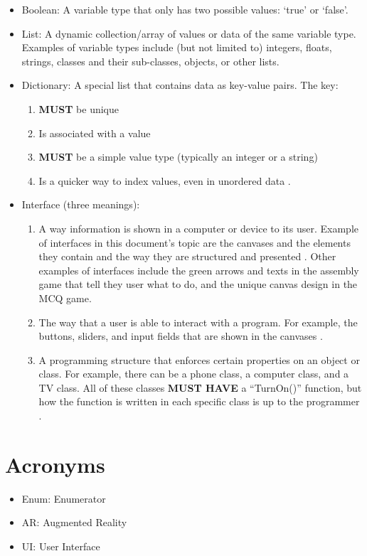 \documentclass[a4paper, 12pt]{article}
\begin{document}
\begin{itemize}
    \item{Boolean: A variable type that only has two possible values: ‘true\normalfont’ or ‘false\normalfont’.}
    \item{List: A dynamic collection/array of values or data of the same variable type. Examples of variable types include (but not limited to) integers, floats, strings, classes and their sub-classes, objects, or other lists.}
    
        \item{Dictionary: A special list that contains data as key-value pairs. The key:
        
        \begin{enumerate}
        
        \item{\textbf{MUST} be unique}
        \item{Is associated with a value}
        \item{\textbf{MUST} be a simple value type (typically an integer or a string)}
        \item{Is a quicker way to index values, even in unordered data \cite{DictionaryMeaning}.}        
        \end{enumerate}        
        }    
    \item{Interface (three meanings):
    \begin{enumerate}
    \item{A way information is shown in a computer or device to its user. Example of interfaces in this document's topic are the canvases and the elements they contain and the way they are structured and presented \cite{InterfaceMeaning}. Other examples of interfaces include the green arrows and texts in the assembly game that tell they user what to do, and the unique canvas design in the MCQ game.}
    
    \item{The way that a user is able to interact with a program. For example, the buttons, sliders, and input fields that are shown in the canvases \cite{InterfaceMeaning}.}
    
    \item{A programming structure that enforces certain properties on an object or class. For example, there can be a phone class, a computer class, and a TV class. All of these classes \textbf{MUST HAVE} a ``TurnOn()\normalfont'' function, but how the function is written in each specific class is up to the programmer \cite{ProgInterfaceMeaning}.}
    
    \end{enumerate}
    
    }
    
 \end{itemize}
\section{Acronyms}

\begin{itemize}
    \item{Enum: Enumerator}
    
    \item{AR: Augmented Reality}
    
    \item{UI: User Interface}
\end{itemize}

\printbibliography
\end{document}
